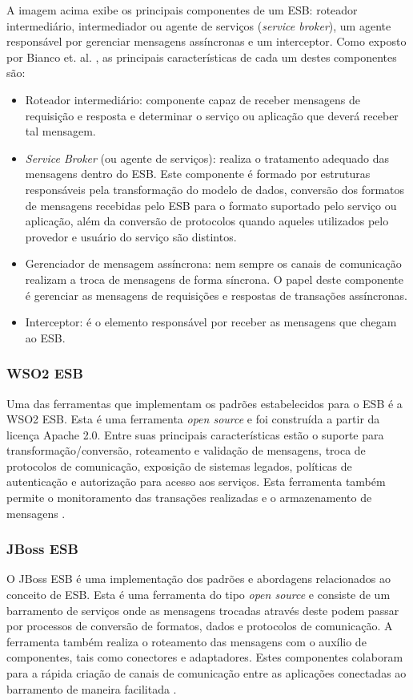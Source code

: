 A imagem acima exibe os principais componentes de um ESB: roteador intermediário, intermediador ou agente de serviços (\textit{service broker}), um agente responsável por gerenciar mensagens assíncronas e um interceptor. Como exposto por Bianco et. al. \cite{bianco_architecting_2011}, as principais características de cada um destes componentes são:

\begin{itemize}
\item Roteador intermediário: componente capaz de receber mensagens de requisição e resposta e determinar o serviço ou aplicação que deverá receber tal mensagem.
\item \textit{Service Broker} (ou agente de serviços): realiza o tratamento adequado das mensagens dentro do ESB. Este componente é formado por estruturas responsáveis pela transformação do modelo de dados, conversão dos formatos de mensagens recebidas pelo ESB para o formato suportado pelo serviço ou aplicação, além da conversão de protocolos quando aqueles utilizados pelo provedor e usuário do serviço são distintos.
\item Gerenciador de mensagem assíncrona: nem sempre os canais de comunicação realizam a troca de mensagens de forma síncrona. O papel deste componente é gerenciar as mensagens de requisições e respostas de transações assíncronas.
\item Interceptor: é o elemento responsável por receber as mensagens que chegam ao ESB.
\end{itemize}

\subsubsection{WSO2 ESB}
Uma das ferramentas que implementam os padrões estabelecidos para o ESB é a WSO2 ESB. Esta é uma ferramenta \textit{open source} e foi construída a partir da licença Apache 2.0. Entre suas principais características estão o suporte para transformação/conversão, roteamento e validação de mensagens, troca de protocolos de comunicação, exposição de sistemas legados, políticas de autenticação e autorização para acesso aos serviços. Esta ferramenta também permite o monitoramento das transações realizadas e o armazenamento de mensagens \cite{siriwardena_enterprise_2013}.

\subsubsection{JBoss ESB}
O JBoss ESB é uma implementação dos padrões e abordagens relacionados ao conceito de ESB. Esta é uma ferramenta do tipo \textit{open source} e consiste de um barramento de serviços onde as mensagens trocadas através deste podem passar por processos de conversão de formatos, dados e protocolos de comunicação. A ferramenta também realiza o roteamento das mensagens com o auxílio de componentes, tais como conectores e adaptadores. Estes componentes colaboram para a rápida criação de canais de comunicação entre as aplicações conectadas ao barramento de maneira facilitada \cite{silva_jbossesb_2008}.


